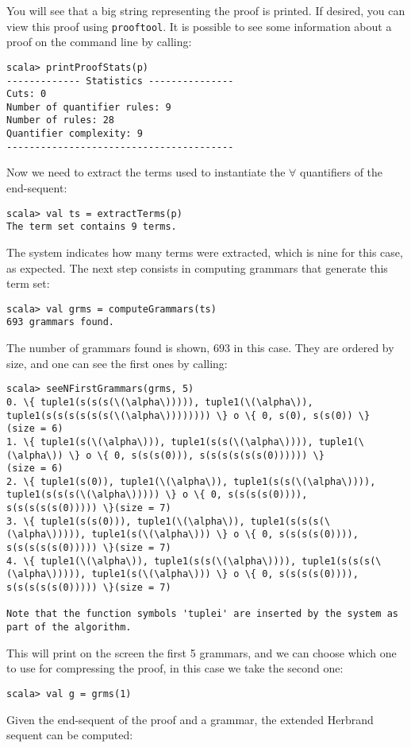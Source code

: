 \documentclass[a4paper,11pt]{article}
\begin{document}
You will see that a big string representing the proof is printed. If desired,
you can view this proof using \texttt{prooftool}. 
It is possible to see some information about a proof on the command line by calling:
\begin{lstlisting}
scala> printProofStats(p)
------------- Statistics ---------------
Cuts: 0
Number of quantifier rules: 9
Number of rules: 28
Quantifier complexity: 9
----------------------------------------
\end{lstlisting}
Now we need to
extract the terms used to instantiate the $\forall$ quantifiers of the
end-sequent:
\begin{lstlisting}
scala> val ts = extractTerms(p)
The term set contains 9 terms.
\end{lstlisting}
The system indicates how many terms were extracted, which is nine for this case,
as expected. The next step consists in computing grammars that generate this
term set:
\begin{lstlisting}
scala> val grms = computeGrammars(ts)
693 grammars found.
\end{lstlisting}
The number of grammars found is shown, 693 in this case. They are ordered
by size, and one can see the first ones by calling:
\begin{lstlisting}
scala> seeNFirstGrammars(grms, 5)
0. \{ tuple1(s(s(s(\(\alpha\))))), tuple1(\(\alpha\)), tuple1(s(s(s(s(s(s(\(\alpha\)))))))) \} o \{ 0, s(0), s(s(0)) \}
(size = 6)
1. \{ tuple1(s(\(\alpha\))), tuple1(s(s(\(\alpha\)))), tuple1(\(\alpha\)) \} o \{ 0, s(s(s(0))), s(s(s(s(s(s(0)))))) \}
(size = 6)
2. \{ tuple1(s(0)), tuple1(\(\alpha\)), tuple1(s(s(\(\alpha\)))), tuple1(s(s(s(\(\alpha\))))) \} o \{ 0, s(s(s(s(0)))), 
s(s(s(s(s(0))))) \}(size = 7)
3. \{ tuple1(s(s(0))), tuple1(\(\alpha\)), tuple1(s(s(s(\(\alpha\))))), tuple1(s(\(\alpha\))) \} o \{ 0, s(s(s(s(0)))), 
s(s(s(s(s(0))))) \}(size = 7)
4. \{ tuple1(\(\alpha\)), tuple1(s(s(\(\alpha\)))), tuple1(s(s(s(\(\alpha\))))), tuple1(s(\(\alpha\))) \} o \{ 0, s(s(s(s(0)))), 
s(s(s(s(s(0))))) \}(size = 7)

Note that the function symbols 'tuplei' are inserted by the system as part of the algorithm.
\end{lstlisting}
This will print on the screen the first 5 grammars, and we can choose which one
to use for compressing the proof, in this case we take the second one:
\begin{lstlisting}
scala> val g = grms(1)
\end{lstlisting}
Given the end-sequent of the proof and a grammar, the extended Herbrand sequent can be computed:
\end{document}
